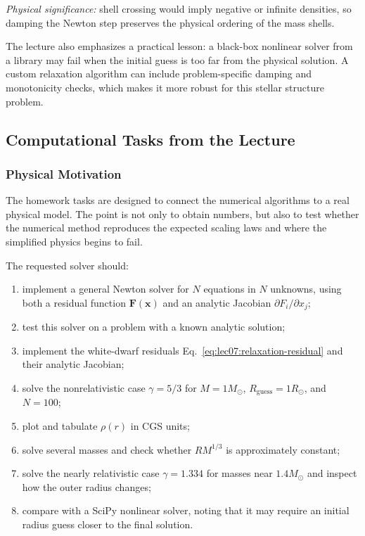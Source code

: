 \textit{Physical significance:} shell crossing would imply negative or
infinite densities, so damping the Newton step preserves the physical
ordering of the mass shells.

The lecture also emphasizes a practical lesson: a black-box nonlinear solver
from a library may fail when the initial guess is too far from the physical
solution. A custom relaxation algorithm can include problem-specific damping
and monotonicity checks, which makes it more robust for this stellar
structure problem.

\subsection{Computational Tasks from the Lecture}
\label{subsec:lec07:computational-tasks}

\subsubsection*{Physical Motivation}
The homework tasks are designed to connect the numerical algorithms to a
real physical model. The point is not only to obtain numbers, but also to
test whether the numerical method reproduces the expected scaling laws and
where the simplified physics begins to fail.

The requested solver should:
\begin{enumerate}
    \item implement a general Newton solver for $N$ equations in $N$
    unknowns, using both a residual function $\mathbf{F}(\mathbf{x})$ and an
    analytic Jacobian $\partial F_i/\partial x_j$;
    \item test this solver on a problem with a known analytic solution;
    \item implement the white-dwarf residuals
    Eq.~\eqref{eq:lec07:relaxation-residual} and their analytic Jacobian;
    \item solve the nonrelativistic case $\gamma=5/3$ for
    $M=1M_\odot$, $R_{\mathrm{guess}}=1R_\odot$, and $N=100$;
    \item plot and tabulate $\rho(r)$ in CGS units;
    \item solve several masses and check whether $RM^{1/3}$ is
    approximately constant;
    \item solve the nearly relativistic case $\gamma=1.334$ for masses near
    $1.4M_\odot$ and inspect how the outer radius changes;
    \item compare with a SciPy nonlinear solver, noting that it may require
    an initial radius guess closer to the final solution.
\end{enumerate}

